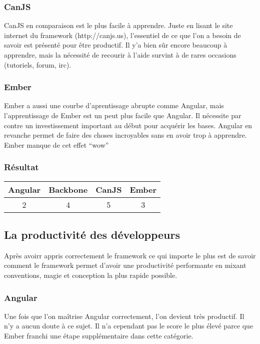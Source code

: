 \subsubsection{CanJS} 

CanJS en comparaison est le plus facile à apprendre. Juste en lisant le site internet du framework (http://canjs.us), l’essentiel de ce que l’on a besoin de savoir est présenté pour être productif. Il y’a bien sûr encore beaucoup à apprendre, mais la nécessité de recourir à l’aide survint à de rares occasions (tutoriels, forum, irc).

\subsubsection{Ember}

Ember a aussi une courbe d’aprentissage abrupte comme Angular, mais l’apprentissage de Ember est un peut plus facile que Angular. Il nécessite par contre un investissement important au début pour acquérir les bases. Angular en revanche permet de faire des choses incroyables sans en avoir trop à apprendre. Ember manque de cet effet “wow”


\subsubsection{Résultat}
\begin{tabular}{|c|c|c|c|}
  \hline 
  Angular & Backbone & CanJS & Ember \\
  \hline 
  2 & 4 & 5 & 3 \\
  \hline
\end{tabular}


\subsection{La productivité des développeurs}

Après avoirr appris correctement le framework ce qui importe le plus est de savoir comment le framework permet d’avoir une productivité performante en mixant conventions, magie et conception la plus rapide possible.

\subsubsection{Angular}

Une fois que l’on maîtrise Angular correctement, l’on devient très productif. Il n'y a aucun doute à ce sujet. Il n’a cependant pas le score le plus élevé parce que Ember franchi une étape supplémentaire dans cette catégorie.


